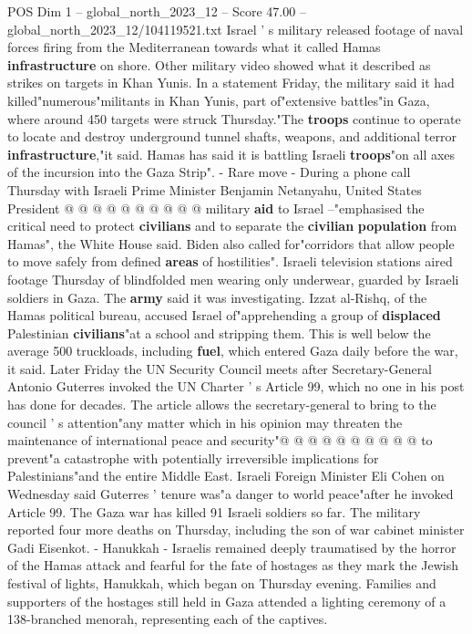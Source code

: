 \begin{textsample}{POS Dim 1 – global\_north\_2023\_12 – Score 47.00 – global\_north\_2023\_12/104119521.txt}
Israel ' s military released footage of naval forces firing from the Mediterranean towards what it called Hamas \textbf{infrastructure} on shore.
Other military video showed what it described as strikes on targets in Khan Yunis.
In a statement Friday, the military said it had killed"numerous"militants in Khan Yunis, part of"extensive battles"in Gaza, where around 450 targets were struck Thursday."The \textbf{troops} continue to operate to locate and destroy underground tunnel shafts, weapons, and additional terror \textbf{infrastructure},"it said.
Hamas has said it is battling Israeli \textbf{troops}"on all axes of the incursion into the Gaza Strip". - Rare move - During a phone call Thursday with Israeli Prime Minister Benjamin Netanyahu, United States President @ @ @ @ @ @ @ @ @ @ military \textbf{aid} to Israel --"emphasised the critical need to protect \textbf{civilians} and to separate the \textbf{civilian} \textbf{population} from Hamas", the White House said.
Biden also called for"corridors that allow people to move safely from defined \textbf{areas} of hostilities".
Israeli television stations aired footage Thursday of blindfolded men wearing only underwear, guarded by Israeli soldiers in Gaza.
The \textbf{army} said it was investigating.
Izzat al-Rishq, of the Hamas political bureau, accused Israel of"apprehending a group of \textbf{displaced} Palestinian \textbf{civilians}"at a school and stripping them.
This is well below the average 500 truckloads, including \textbf{fuel}, which entered Gaza daily before the war, it said.
Later Friday the UN Security Council meets after Secretary-General Antonio Guterres invoked the UN Charter ' s Article 99, which no one in his post has done for decades.
The article allows the secretary-general to bring to the council ' s attention"any matter which in his opinion may threaten the maintenance of international peace and security"@ @ @ @ @ @ @ @ @ @ to prevent"a catastrophe with potentially irreversible implications for Palestinians"and the entire Middle East.
Israeli Foreign Minister Eli Cohen on Wednesday said Guterres ' tenure was"a danger to world peace"after he invoked Article 99.
The Gaza war has killed 91 Israeli soldiers so far.
The military reported four more deaths on Thursday, including the son of war cabinet minister Gadi Eisenkot. - Hanukkah - Israelis remained deeply traumatised by the horror of the Hamas attack and fearful for the fate of hostages as they mark the Jewish festival of lights, Hanukkah, which began on Thursday evening.
Families and supporters of the hostages still held in Gaza attended a lighting ceremony of a 138-branched menorah, representing each of the captives.

\end{textsample}
